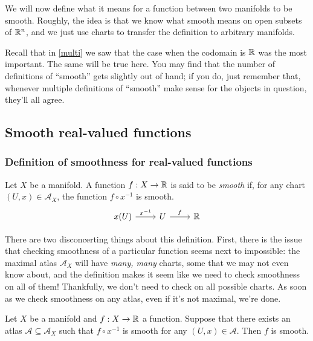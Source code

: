 
We will now define what it means for a function between two manifolds to be smooth. Roughly, the idea is that we know what smooth means on open subsets of $\mathbb{R}^n$, and we just use charts to transfer the definition to arbitrary manifolds. 

Recall that in \cref{multi} we saw that the case when the codomain is $\mathbb{R}$ was the most important. The same will be true here. You may find that the number of definitions of ``smooth'' gets slightly out of hand; if you do, just remember that, whenever multiple definitions of ``smooth'' make sense for the objects in question, they'll all agree. 

\subsection{Smooth real-valued functions}

\subsubsection*{Definition of smoothness for real-valued functions}

\begin{definition} \label{smooth-real-valued} 
	Let $X$ be a manifold. A function $f : X \to \mathbb{R}$ is said to be \emph{smooth} if, for any chart $(U, x) \in \mathscr{A}_X$, the function $f \circ x^{-1}$ is smooth.
	\[ \begin{tikzcd} x(U) \ar{r}{x^{-1}} & U \ar{r}{f} & \R \end{tikzcd} \]
\end{definition}

There are two disconcerting things about this definition. First, there is the issue that checking smoothness of a particular function seems next to impossible: the maximal atlas $\mathscr{A}_X$ will have \emph{many, many} charts, some that we may not even know about, and the definition makes it seem like we need to check smoothness on all of them! Thankfully, we don't need to check on all possible charts. As soon as we check smoothness on any atlas, even if it's not maximal, we're done. 

\begin{lemma} \label{smooth-real-valued-local}
	Let $X$ be a manifold and $f : X \to \mathbb{R}$ a function. Suppose that there exists an atlas $\mathscr{A} \subseteq \mathscr{A}_X$ such that $f \circ x^{-1}$ is smooth for any $(U, x) \in \mathscr{A}$. Then $f$ is smooth. 
\end{lemma}

